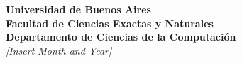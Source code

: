 \begin{titlepage}
\begin{center}
\begin{figure}[h]
  \begin{center}
  \end{center}
\end{figure}

\vspace*{10mm}


{\bf\large Universidad de Buenos Aires} \\[10pt]
{\bf\large Facultad de Ciencias Exactas y Naturales}\\%



{\bf\large Departamento de Ciencias de la Computación}\\%
{\it\large [Insert Month and Year]}

\end{center}

\end{titlepage}

\clearpage

